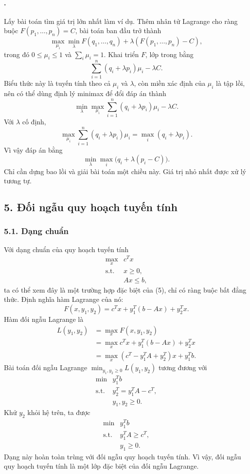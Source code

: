\documentclass[11pt]{article}
\begin{document}
\paragraph{.}
Lấy bài toán tìm giá trị lớn nhất làm ví dụ. Thêm nhân tử Lagrange cho ràng
buộc \(F(p_1,\ldots,p_n)=C\), bài toán ban đầu trở thành
\[
  \max_{\mu_i}\min_\lambda
  F(q_1,\ldots,q_n)+\lambda(F(p_1,\ldots,p_n)-C),
\]
trong đó \(0\le \mu_i\le 1\) và \(\sum_i\mu_i=1\). Khai triển \(F\), lớp trong
bằng
\[
  \sum_{i=1}^{n}(q_i+\lambda p_i)\mu_i-\lambda C.
\]
Biểu thức này là tuyến tính theo cả \(\mu_i\) và \(\lambda\), còn miền xác định
của \(\mu_i\) là tập lồi, nên có thể dùng định lý minimax để đổi đáp án thành
\[
  \min_\lambda\max_{\mu_i}
  \sum_{i=1}^{n}(q_i+\lambda p_i)\mu_i-\lambda C.
\]
Với \(\lambda\) cố định,
\[
  \max_{\mu_i}\sum_{i=1}^{n}(q_i+\lambda p_i)\mu_i
  =\max_i(q_i+\lambda p_i).
\]
Vì vậy đáp án bằng
\[
  \min_\lambda\max_i\bigl(q_i+\lambda(p_i-C)\bigr).
\]
Chỉ cần dựng bao lồi và giải bài toán một chiều này. Giá trị nhỏ nhất được xử
lý tương tự.

\subsection*{5. Đối ngẫu quy hoạch tuyến tính}

\subsubsection*{5.1. Dạng chuẩn}

Với dạng chuẩn của quy hoạch tuyến tính
\[
\begin{array}{ll}
  \max_x & c^Tx\\
  \text{s.t.} & x\ge 0,\\
              & Ax\le b,
\end{array}
\tag{7}
\]
ta có thể xem đây là một trường hợp đặc biệt của (5), chỉ có ràng buộc bất
đẳng thức. Định nghĩa hàm Lagrange của nó:
\[
  F(x,y_1,y_2)=c^Tx+y_1^T(b-Ax)+y_2^Tx.
\]
Hàm đối ngẫu Lagrange là
\[
\begin{aligned}
  L(y_1,y_2)
  &=\max_x F(x,y_1,y_2)\\
  &=\max_x c^Tx+y_1^T(b-Ax)+y_2^Tx\\
  &=\max_x (c^T-y_1^TA+y_2^T)x+y_1^Tb.
\end{aligned}
\]
Bài toán đối ngẫu Lagrange \(\min_{y_1,y_2\ge 0}L(y_1,y_2)\) tương đương với
\[
\begin{array}{ll}
  \min & y_1^Tb\\
  \text{s.t.} & y_2^T=y_1^TA-c^T,\\
              & y_1,y_2\ge 0.
\end{array}
\]
Khử \(y_2\) khỏi hệ trên, ta được
\[
\begin{array}{ll}
  \min & y_1^Tb\\
  \text{s.t.} & y_1^TA\ge c^T,\\
              & y_1\ge 0.
\end{array}
\]
Dạng này hoàn toàn trùng với đối ngẫu quy hoạch tuyến tính. Vì vậy, đối ngẫu
quy hoạch tuyến tính là một lớp đặc biệt của đối ngẫu Lagrange.
\end{document}
